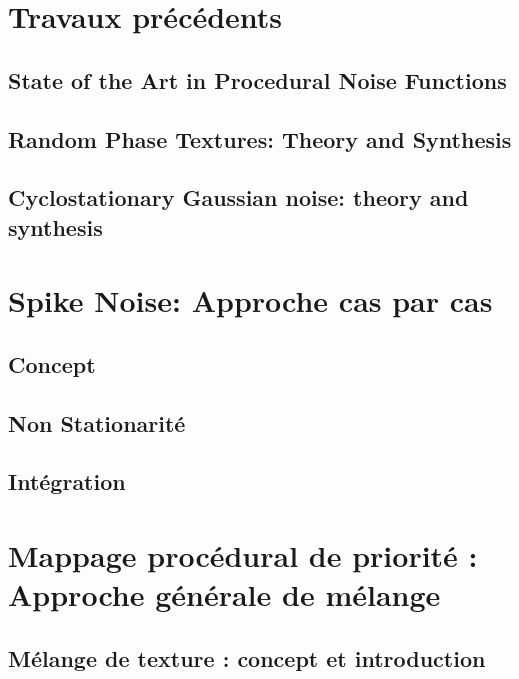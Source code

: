 \documentclass[9pt, twocolumn]{article} %
\begin{document}
\section{Travaux précédents}

\subsection{State of the Art in Procedural Noise Functions}

\subsection{Random Phase Textures: Theory and Synthesis}

\subsection{Cyclostationary Gaussian noise: theory and synthesis}

\section{Spike Noise: Approche cas par cas}

\subsection{Concept}

\subsection{Non Stationarité}

\subsection{Intégration}

\clearpage

\section{Mappage procédural de priorité : Approche générale de mélange}

\subsection{Mélange de texture : concept et introduction}
\end{document}
